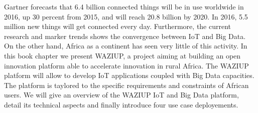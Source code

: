 
Gartner forecasts that 6.4 billion connected things will be in use worldwide in 2016, up 30 percent from 2015, and will reach 20.8 billion by 2020. In 2016, 5.5 million new things will get connected every day.
Furthermore, the current research  and marker trends shows the convergence between IoT and Big Data.
On the other hand, Africa as a continent has seen very little of this activity.
In this book chapter we present WAZIUP, a project aiming at building an open innovation platform able to accelerate innovation in rural Africa.
The WAZIUP platform will allow to develop IoT applications coupled with Big Data capacities.
The platform is taylored to the specific requirements and constraints of African users.
We will give an overview of the WAZIUP IoT and Big Data platform, detail its technical aspects and finally introduce four use case deployements.
